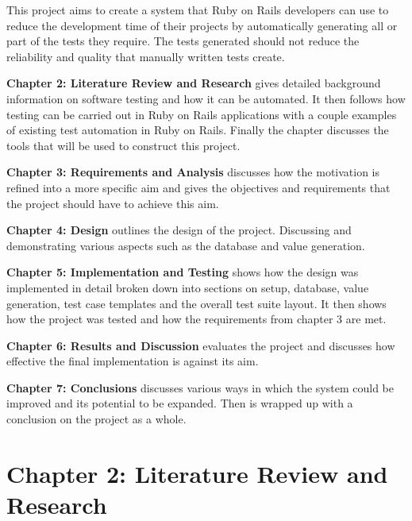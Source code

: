 \documentclass[a4paper,12pt]{article}
\begin{document}
\vspace{3mm}
\par This project aims to create a system that Ruby on Rails developers can use to reduce the development time of their projects by automatically generating all or part of the tests they require. The tests generated should not reduce the reliability and quality that manually written tests create.
\vspace{3mm}
\par \textbf{Chapter 2: Literature Review and Research} gives detailed background information on software testing and how it can be automated. It then follows how testing can be carried out in Ruby on Rails applications with a couple examples of existing test automation in Ruby on Rails. Finally the chapter discusses the tools that will be used to construct this project.
\vspace{3mm}
\par \textbf{Chapter 3: Requirements and Analysis} discusses how the motivation is refined into a more specific aim and gives the objectives and requirements that the project should have to achieve this aim.
\vspace{3mm}
\par \textbf{Chapter 4: Design} outlines the design of the project. Discussing and demonstrating various aspects such as the database and value generation.
\vspace{3mm}
\par \textbf{Chapter 5: Implementation and Testing} shows how the design was implemented in detail broken down into sections on setup, database, value generation, test case templates and the overall test suite layout. It then shows how the project was tested and how the requirements from chapter 3 are met.
\vspace{3mm}
\par \textbf{Chapter 6: Results and Discussion} evaluates the project and discusses how effective the final implementation is against its aim.
\vspace{3mm}
\par \textbf{Chapter 7: Conclusions} discusses various ways in which the system could be improved and its potential to be expanded. Then is wrapped up with a conclusion on the project as a whole.






\newpage
\section{Chapter 2: Literature Review and Research}
\end{document}
